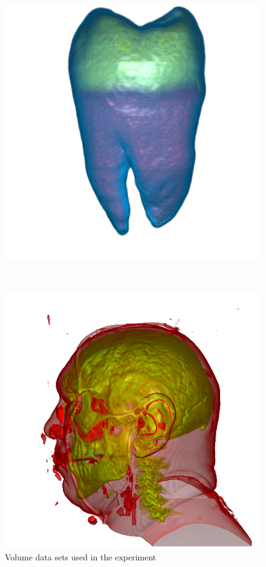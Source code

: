 \begin{figure}
\begin{minipage}{.15\textwidth}
\end{minipage}~
\begin{minipage}{.15\textwidth}
	\includegraphics[width=1\linewidth]{images/tooth_naive}
\end{minipage}~
\begin{minipage}{.15\textwidth}
	\includegraphics[width=1\linewidth]{images/vismale_naive}
\end{minipage}
\caption{Volume data sets used in the experiment}
\label{fig:experiment_data_sets}
\end{figure}

